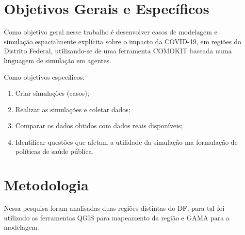 
\section{Objetivos Gerais e Específicos}%

Como objetivo geral nesse trabalho é desenvolver casos de modelagem e simulação espacialmente explícita sobre o impacto da COVID-19, em regiões do Distrito Federal, utilizando-se de uma ferramenta COMOKIT baseada numa linguagem de simulação  em agentes.

Como objetivos específicos: 
\begin{enumerate}
\item Criar simulações (casos);
\item Realizar as simulações e coletar dados;
\item Comparar os dados obtidos com dados reais disponíveis;
\item Identificar questões que afetam a utilidade da simulação ma formulação de políticas de saúde pública.


\end{enumerate}

\section{Metodologia}%

Nessa pesquisa foram analisadas duas regiões distintas do DF, para tal foi utilizado as ferramentas QGIS para mapeamento da região e GAMA para a modelagem. 

